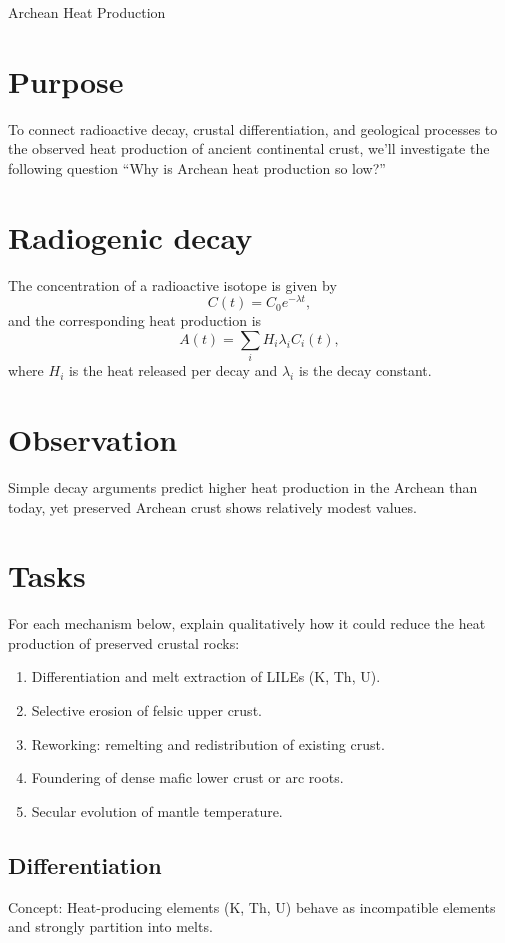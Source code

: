 \begin{activity}{Archean Heat Production}

\section*{Purpose}

To connect radioactive decay, crustal differentiation, and geological processes to the observed heat production of ancient continental crust, we'll investigate the following question ``Why is Archean heat production so low?''

\section*{Radiogenic decay}
The concentration of a radioactive isotope is given by
\[
C(t) = C_0 e^{-\lambda t},
\]
and the corresponding heat production is
\[
A(t) = \sum_i H_i \lambda_i C_i(t),
\]
where $H_i$ is the heat released per decay and $\lambda_i$ is the decay constant.

\section*{Observation}
Simple decay arguments predict higher heat production in the Archean than today, yet preserved Archean crust shows relatively modest values.


\section*{Tasks}
For each mechanism below, explain qualitatively how it could reduce the heat
production of preserved crustal rocks:
\begin{enumerate}
  \item Differentiation and melt extraction of LILEs (K, Th, U).
  \item Selective erosion of felsic upper crust.
  \item Reworking: remelting and redistribution of existing crust.
  \item Foundering of dense mafic lower crust or arc roots.
  \item Secular evolution of mantle temperature.
\end{enumerate}

\subsection*{Differentiation}
Concept: Heat-producing elements (K, Th, U) behave as incompatible elements and strongly partition into melts.


\end{activity}
